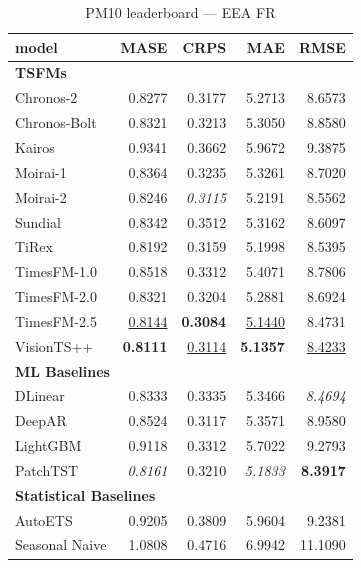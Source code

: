 \begin{table}[H]
\caption{PM10 leaderboard --- EEA FR}
\centering
\begin{small}
\begin{tabular}{lrrrr}
\toprule
model & MASE & CRPS & MAE & RMSE \\
\midrule
\multicolumn{5}{l}{\textbf{TSFMs}} \\
Chronos-2 & 0.8277 & 0.3177 & 5.2713 & 8.6573 \\
Chronos-Bolt & 0.8321 & 0.3213 & 5.3050 & 8.8580 \\
Kairos & 0.9341 & 0.3662 & 5.9672 & 9.3875 \\
Moirai-1 & 0.8364 & 0.3235 & 5.3261 & 8.7020 \\
Moirai-2 & 0.8246 & \textit{0.3115} & 5.2191 & 8.5562 \\
Sundial & 0.8342 & 0.3512 & 5.3162 & 8.6097 \\
TiRex & 0.8192 & 0.3159 & 5.1998 & 8.5395 \\
TimesFM-1.0 & 0.8518 & 0.3312 & 5.4071 & 8.7806 \\
TimesFM-2.0 & 0.8321 & 0.3204 & 5.2881 & 8.6924 \\
TimesFM-2.5 & \underline{0.8144} & \textbf{0.3084} & \underline{5.1440} & 8.4731 \\
VisionTS++ & \textbf{0.8111} & \underline{0.3114} & \textbf{5.1357} & \underline{8.4233} \\
\midrule
\multicolumn{5}{l}{\textbf{ML Baselines}} \\
DLinear & 0.8333 & 0.3335 & 5.3466 & \textit{8.4694} \\
DeepAR & 0.8524 & 0.3117 & 5.3571 & 8.9580 \\
LightGBM & 0.9118 & 0.3312 & 5.7022 & 9.2793 \\
PatchTST & \textit{0.8161} & 0.3210 & \textit{5.1833} & \textbf{8.3917} \\
\midrule
\multicolumn{5}{l}{\textbf{Statistical Baselines}} \\
AutoETS & 0.9205 & 0.3809 & 5.9604 & 9.2381 \\
Seasonal Naive & 1.0808 & 0.4716 & 6.9942 & 11.1090 \\
\bottomrule
\end{tabular}
\end{small}
\end{table}